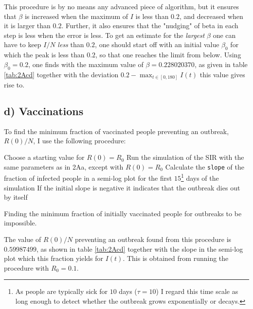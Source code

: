 This procedure is by no means any advanced piece of algorithm, but it ensures that $\beta$ is increased when the maximum of $I$ is less than $0.2$, and decreased when it is larger than $0.2$. Further, it also ensures that the "nudging" of beta in each step is less when the error is less. To get an estimate for the \textit{largest} $\beta$ one can have to keep $I/N$ \textit{less} than $0.2$, one should start off with an initial value $\beta_0$ for which the peak is less than $0.2$, so that one reaches the limit from below. Using $\beta_0 = 0.2$, one finds with the maximum value of $\beta = 0.228020370$, as given in table \ref{tab:2Acd} together with the deviation $0.2 - \max_{t\in[0,180]} I(t)$ this value gives rise to.  



\subsection{d) Vaccinations}

To find the minimum fraction of vaccinated people preventing an outbreak, $R(0)/N$, I use the following procedure:

\begin{algorithm}[H]
	Choose a starting value for $R(0) = R_0$\;
	Run the simulation of the SIR with the same parameters as in 2Aa, except with $R(0) = R_0$ \;
	Calculate the \texttt{slope} of the fraction of infected people in a semi-log plot for the first $15$\footnote{As people are typically sick for $10$ days ($\tau = 10$) I regard this time scale as long enough to detect whether the outbreak grows exponentially or decays.} days of the simulation\;
	If the initial slope is negative it indicates that the outbreak dies out by itself\;
	\caption{Finding the minimum fraction of initially vaccinated people for outbreaks to be impossible.}
\end{algorithm} 

The value of $R(0)/N$ preventing an outbreak found from this procedure is $0.59987499$, as shown in table \ref{tab:2Acd} together with the slope in the semi-log plot which this fraction yields for $I(t)$. This is obtained from running the procedure with $R_0 = 0.1$.

